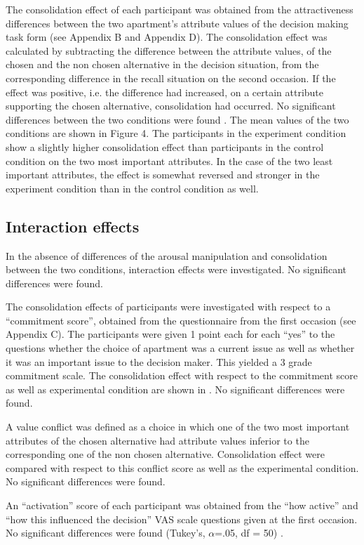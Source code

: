 The consolidation effect of each participant was obtained from the
attractiveness differences between the two apartment's attribute
values of the decision making task form (see Appendix B and Appendix
D).  The consolidation effect was calculated by subtracting the
difference between the attribute values, of the chosen and the non
chosen alternative in the decision situation, from the corresponding
difference in the recall situation on the second occasion.  If the
effect was positive, i.e. the difference had increased, on a certain
attribute supporting the chosen alternative, consolidation had
occurred.  No significant differences between the two conditions were
found . The mean values of the two conditions are shown in Figure 4.
The participants in the experiment condition show a slightly higher
consolidation effect than participants in the control condition on the
two most important attributes.  In the case of the two least important
attributes, the effect is somewhat reversed and stronger in the
experiment condition than in the control condition as well.


\subsection{Interaction effects}

In the absence of differences of the arousal manipulation and
consolidation between the two conditions, interaction effects were
investigated. No significant differences were found.

The consolidation effects of participants were investigated with
respect to a ``commitment score'', obtained from the questionnaire from
the first occasion (see Appendix C). The participants were given 1
point each for each ``yes'' to the questions whether the choice of
apartment was a current issue as well as whether it was an important
issue to the decision maker. This yielded a 3 grade commitment scale.
The consolidation effect with respect to the commitment score as well
as experimental condition are shown in . No
significant differences were found.


A value conflict was defined as a choice in which one of the two most
important attributes of the chosen alternative had attribute values
inferior to the corresponding one of the non chosen
alternative. Consolidation effect were compared with respect to this
conflict score as well as the experimental condition. No significant
differences were found.

An ``activation'' score of each participant was obtained from the ``how
active'' and ``how this influenced the decision'' VAS scale questions
given at the first occasion.   No significant differences were found
(Tukey's, $\alpha$=.05, df = 50) .

